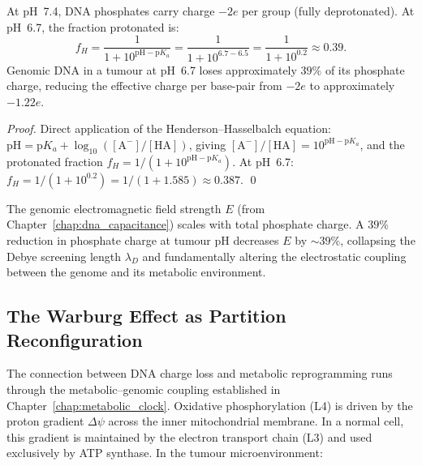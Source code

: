 \begin{proposition}
\label{prop:phosphate_protonation}
At pH~7.4, DNA phosphates carry charge $-2e$ per group (fully deprotonated).
At pH~6.7, the fraction protonated is:
\begin{equation}
  f_H = \frac{1}{1 + 10^{\mathrm{pH} - \mathrm{p}K_a}}
       = \frac{1}{1 + 10^{6.7 - 6.5}} = \frac{1}{1 + 10^{0.2}} \approx 0.39.
\end{equation}
Genomic DNA in a tumour at pH~6.7 loses approximately $39\%$ of its phosphate
charge, reducing the effective charge per base-pair from $-2e$ to approximately
$-1.22e$.
\end{proposition}

\begin{proof}
Direct application of the Henderson--Hasselbalch equation:
$\mathrm{pH} = \mathrm{p}K_a + \log_{10}([\mathrm{A}^-]/[\mathrm{HA}])$,
giving $[\mathrm{A}^-]/[\mathrm{HA}] = 10^{\mathrm{pH} - \mathrm{p}K_a}$,
and the protonated fraction $f_H = 1/(1 + 10^{\mathrm{pH} - \mathrm{p}K_a})$.
At pH~6.7: $f_H = 1/(1 + 10^{0.2}) = 1/(1 + 1.585) \approx 0.387$. \qed
\end{proof}

\begin{corollary}
\label{cor:emf_reduction}
The genomic electromagnetic field strength $E$ (from Chapter~\ref{chap:dna_capacitance})
scales with total phosphate charge. A $39\%$ reduction in phosphate charge at
tumour pH decreases $E$ by $\sim 39\%$, collapsing the Debye screening length
$\lambda_D$ and fundamentally altering the electrostatic coupling between the
genome and its metabolic environment.
\end{corollary}

\subsection{The Warburg Effect as Partition Reconfiguration}

The connection between DNA charge loss and metabolic reprogramming runs through
the metabolic--genomic coupling established in Chapter~\ref{chap:metabolic_clock}.
Oxidative phosphorylation (L4) is driven by the proton gradient $\Delta\psi$
across the inner mitochondrial membrane. In a normal cell, this gradient is
maintained by the electron transport chain (L3) and used exclusively by ATP
synthase. In the tumour microenvironment:

